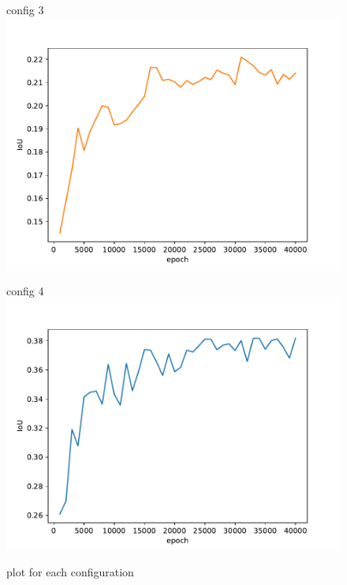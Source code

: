 \documentclass[11pt,a4paper,DIV=14,headinclude=false,footinclude=false]{scrartcl}
\begin{document}
\begin{figure}[h]
    \begin{minipage}{.5\textwidth} \centering
        config 3
        \includegraphics[width=\linewidth,keepaspectratio,clip,trim=0 0 30px 30px]{plots/config3.pdf}
    \end{minipage}\hfill
    \begin{minipage}{.5\textwidth}\centering
        config 4
        \includegraphics[width=\linewidth,keepaspectratio,clip,trim=0 0 30px 30px]{plots/config4.pdf}
     \end{minipage}
     \caption{plot for each configuration}\label{fig:single}
\end{figure}
\end{document}
